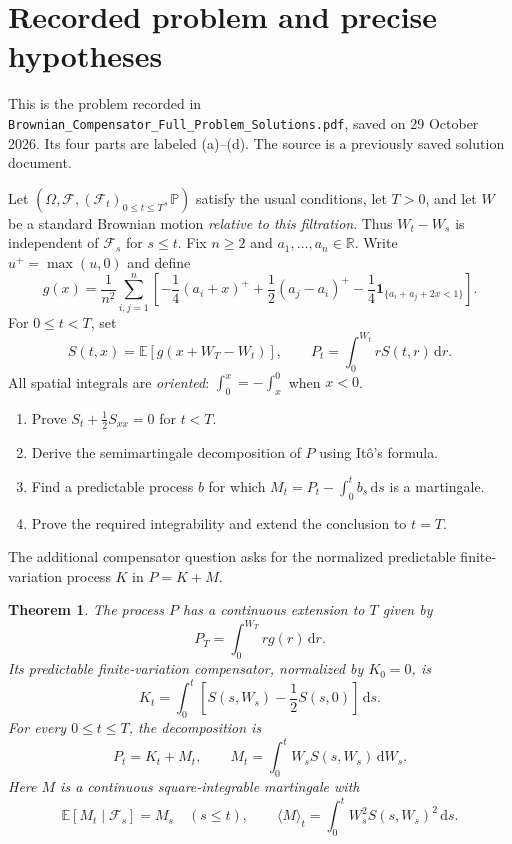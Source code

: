 \documentclass[11pt,letterpaper]{article}
\newtheorem{theorem}{Theorem}
\newcommand{\E}{\mathbb E}
\newcommand{\Pbb}{\mathbb P}
\newcommand{\R}{\mathbb R}
\newcommand{\F}{\mathcal F}
\newcommand{\dd}{\,\mathrm d}
\newcommand{\ind}{\mathbf1}
\begin{document}
\section{Recorded problem and precise hypotheses}
This is the problem recorded in \texttt{Brownian\_Compensator\_Full\_Problem\_Solutions.pdf}, saved on 29 October 2026. Its four parts are labeled (a)--(d). The source is a previously saved solution document.

Let $(\Omega,\F,(\F_t)_{0\le t\le T},\Pbb)$ satisfy the usual conditions, let $T>0$, and let $W$ be a standard Brownian motion \emph{relative to this filtration}. Thus $W_t-W_s$ is independent of $\F_s$ for $s\le t$. Fix $n\ge2$ and $a_1,\ldots,a_n\in\R$. Write $u^+=\max(u,0)$ and define
\begin{equation}\label{eq:g}
g(x)=\frac1{n^2}\sum_{i,j=1}^n
\left[-\frac14(a_i+x)^++\frac12(a_j-a_i)^+
-\frac14\ind_{\{a_i+a_j+2x<1\}}\right].
\end{equation}
For $0\le t<T$, set
\begin{equation}\label{eq:defS}
S(t,x)=\E[g(x+W_T-W_t)],\qquad
P_t=\int_0^{W_t}rS(t,r)\dd r.
\end{equation}
All spatial integrals are \emph{oriented}: $\int_0^x=-\int_x^0$ when $x<0$.

\begin{enumerate}[label=\textbf{(\alph*)}]
\item Prove $S_t+\tfrac12S_{xx}=0$ for $t<T$.
\item Derive the semimartingale decomposition of $P$ using It\^o's formula.
\item Find a predictable process $b$ for which $M_t=P_t-\int_0^t b_s\dd s$ is a martingale.
\item Prove the required integrability and extend the conclusion to $t=T$.
\end{enumerate}
The additional compensator question asks for the normalized predictable finite-variation process $K$ in $P=K+M$.

\begin{theorem}\label{thm:main}
The process $P$ has a continuous extension to $T$ given by
\begin{equation}\label{eq:PT}
P_T=\int_0^{W_T}rg(r)\dd r.
\end{equation}
Its predictable finite-variation compensator, normalized by $K_0=0$, is
\begin{equation}\label{eq:K}
\boxed{K_t=\int_0^t\left[S(s,W_s)-\frac12S(s,0)\right]\dd s.}
\end{equation}
For every $0\le t\le T$, the decomposition is
\begin{equation}\label{eq:main}
\boxed{P_t=K_t+M_t,\qquad M_t=\int_0^tW_sS(s,W_s)\dd W_s.}
\end{equation}
Here $M$ is a continuous square-integrable martingale with
\begin{equation}\label{eq:qv}
\E[M_t\mid\F_s]=M_s\quad(s\le t),\qquad
\langle M\rangle_t=\int_0^tW_s^2S(s,W_s)^2\dd s.
\end{equation}
\end{theorem}
\end{document}
